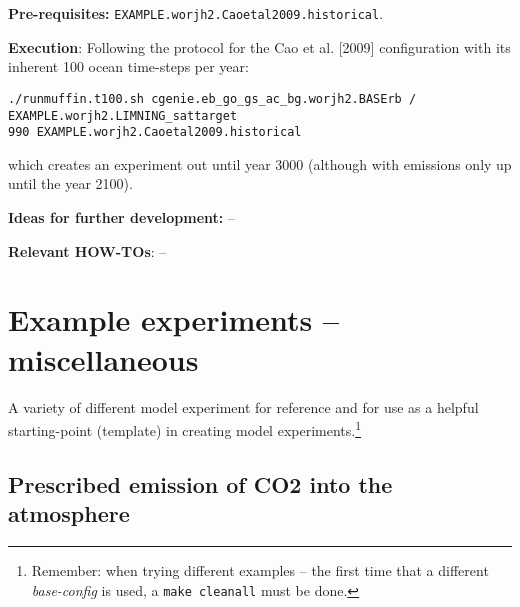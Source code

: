 \documentclass[10pt,twoside]{article}
\begin{document}
\noindent \textbf{Pre-requisites:} \texttt{EXAMPLE.worjh2.Caoetal2009.historical}.

\noindent \textbf{Execution}: Following the protocol for the Cao et al. [2009] configuration with its inherent 100 ocean time-steps per year:
\vspace{-10pt}\small\begin{verbatim}./runmuffin.t100.sh cgenie.eb_go_gs_ac_bg.worjh2.BASErb / EXAMPLE.worjh2.LIMNING_sattarget 
990 EXAMPLE.worjh2.Caoetal2009.historical\end{verbatim}\normalsize\vspace{-10pt}
which creates an experiment out until year 3000 (although with emissions only up until the year 2100).

\noindent \textbf{Ideas for further development:} --

\noindent \textbf{Relevant HOW-TOs}: --


\newpage
\section{Example experiments -- \textbf{miscellaneous}}\label{example_experiments_misc}

A variety of different model experiment for reference and for use as a helpful starting-point (template) in creating model experiments.\footnote{Remember: when trying different examples -- the first time that a different \textit{base-config} is used, a \texttt{make cleanall} must be done.}


\subsection{Prescribed emission of CO2 into the atmosphere}\label{EXAMPLE_worjh2_PO4Fe_CO2EMISSIONS}
\end{document}
